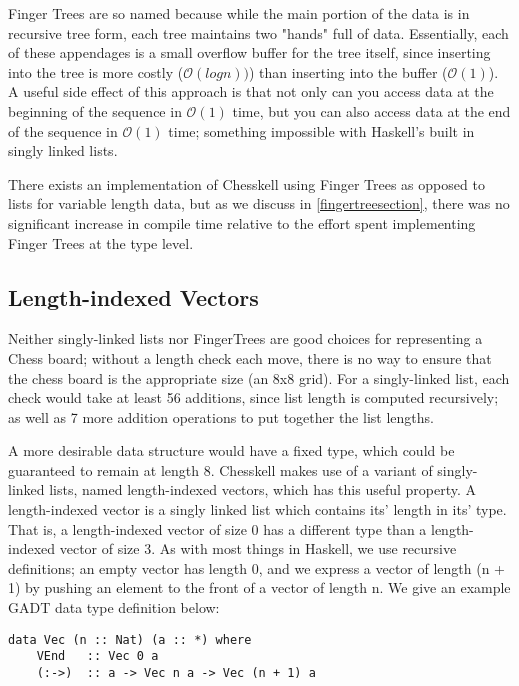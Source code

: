 Finger Trees are so named because while the main portion of the data is in recursive tree form, each tree maintains two "hands" full of data. Essentially, each of these appendages is a small overflow buffer for the tree itself, since inserting into the tree is more costly ($\mathcal{O}(log n))$) than inserting into the buffer ($\mathcal{O}(1)$). A useful side effect of this approach is that not only can you access data at the beginning of the sequence in $\mathcal{O}(1)$ time, but you can also access data at the end of the sequence in $\mathcal{O}(1)$ time; something impossible with Haskell's built in singly linked lists.

There exists an implementation of Chesskell using Finger Trees as opposed to lists for variable length data, but as we discuss in \cref{fingertreesection}, there was no significant increase in compile time relative to the effort spent implementing Finger Trees at the type level.

\subsection{Length-indexed Vectors} \label{lengthindexedvectors}

Neither singly-linked lists nor FingerTrees are good choices for representing a Chess board; without a length check each move, there is no way to ensure that the chess board is the appropriate size (an 8x8 grid). For a singly-linked list, each check would take at least 56 additions, since list length is computed recursively; as well as 7 more addition operations to put together the list lengths.

A more desirable data structure would have a fixed type, which could be guaranteed to remain at length 8. Chesskell makes use of a variant of singly-linked lists, named length-indexed vectors, which has this useful property. A length-indexed vector is a singly linked list which contains its' length in its' type. That is, a length-indexed vector of size 0 has a different type than a length-indexed vector of size 3. As with most things in Haskell, we use recursive definitions; an empty vector has length 0, and we express a vector of length (n + 1) by pushing an element to the front of a vector of length n. We give an example GADT data type definition below:

\begin{lstlisting}
data Vec (n :: Nat) (a :: *) where
    VEnd   :: Vec 0 a
    (:->)  :: a -> Vec n a -> Vec (n + 1) a
\end{lstlisting}

